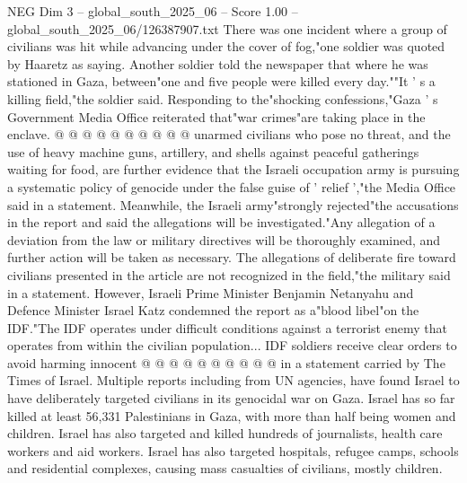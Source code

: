 \begin{textsample}{NEG Dim 3 – global\_south\_2025\_06 – Score 1.00 – global\_south\_2025\_06/126387907.txt}
There was one incident where a group of civilians was hit while advancing under the cover of fog,"one soldier was quoted by Haaretz as saying.
Another soldier told the newspaper that where he was stationed in Gaza, between"one and five people were killed every day.""It ' s a killing field,"the soldier said.
Responding to the"shocking confessions,"Gaza ' s Government Media Office reiterated that"war crimes"are taking place in the enclave. @ @ @ @ @ @ @ @ @ @ unarmed civilians who pose no threat, and the use of heavy machine guns, artillery, and shells against peaceful gatherings waiting for food, are further evidence that the Israeli occupation army is pursuing a systematic policy of genocide under the false guise of ' relief ',"the Media Office said in a statement.
Meanwhile, the Israeli army"strongly rejected"the accusations in the report and said the allegations will be investigated."Any allegation of a deviation from the law or military directives will be thoroughly examined, and further action will be taken as necessary.
The allegations of deliberate fire toward civilians presented in the article are not recognized in the field,"the military said in a statement.
However, Israeli Prime Minister Benjamin Netanyahu and Defence Minister Israel Katz condemned the report as a"blood libel"on the IDF."The IDF operates under difficult conditions against a terrorist enemy that operates from within the civilian population...
IDF soldiers receive clear orders to avoid harming innocent @ @ @ @ @ @ @ @ @ @ in a statement carried by The Times of Israel.
Multiple reports including from UN agencies, have found Israel to have deliberately targeted civilians in its genocidal war on Gaza.
Israel has so far killed at least 56,331 Palestinians in Gaza, with more than half being women and children.
Israel has also targeted and killed hundreds of journalists, health care workers and aid workers.
Israel has also targeted hospitals, refugee camps, schools and residential complexes, causing mass casualties of civilians, mostly children.

\end{textsample}
